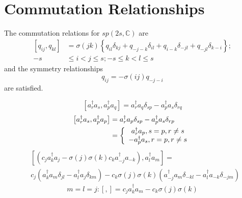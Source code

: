 \documentclass[aps,preprint]{revtex4}%
\begin{document}
\section{Commutation Relationships}

The commutation relations for $sp\left(  2s,\mathbb{C}\right)  $ are
\begin{align}
\left[  q_{ij},q_{kl}\right]   &  =\sigma\left(  jk\right)  \left\{
q_{il}\delta_{kj}+q_{-j-k}\delta_{il}+q_{i-k}\delta_{-jl}+q_{-jl}\delta
_{k-i}\right\}  ;\\
-s  &  \leq i<j\leq s;-s\leq k<l\leq s
\end{align}
and the symmetry relationships
\begin{equation}
q_{ij}=-\sigma\left(  ij\right)  q_{-j-i}%
\end{equation}
are satisfied.%

\begin{equation}
\left[  a_{r}^{\dagger}a_{s},a_{p}^{\dagger}a_{q}\right]  =a_{r}^{\dagger
}a_{q}\delta_{sp}-a_{p}^{\dagger}a_{s}\delta_{rq}%
\end{equation}%
\begin{align}
\left[  a_{r}^{\dagger}a_{s},a_{p}^{\dagger}a_{p}\right]   &  =a_{r}^{\dagger
}a_{p}\delta_{sp}-a_{p}^{\dagger}a_{s}\delta_{rp}\\
&  =\left\{
\begin{array}
[c]{c}%
a_{r}^{\dagger}a_{p},s=p,r\neq s\\
-a_{p}^{\dagger}a_{s},r=p,r\neq s
\end{array}
\right.
\end{align}%
\begin{align}
&  \left[  \left(  c_{j}a_{k}^{\dagger}a_{j}-\sigma\left(  j\right)
\sigma\left(  k\right)  c_{k}a_{-j}^{\dagger}a_{-k}\right)  ,a_{l}^{\dagger
}a_{m}\right]  =\\
&  c_{j}\left(  a_{k}^{\dagger}a_{m}\delta_{jl}-a_{l}^{\dagger}a_{j}%
\delta_{km}\right)  -c_{k}\sigma\left(  j\right)  \sigma\left(  k\right)
\left(  a_{-j}^{\dagger}a_{m}\delta_{-kl}-a_{l}^{\dagger}a_{-k}\delta
_{-jm}\right)
\end{align}%
\begin{equation}
m=l=j:\left[  ,\right]  =c_{j}a_{k}^{\dagger}a_{m}-c_{k}\sigma\left(
j\right)  \sigma\left(  k\right)
\end{equation}
\end{document}
